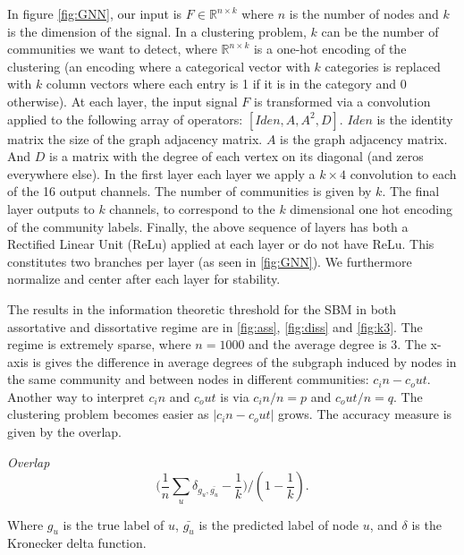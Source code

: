 In figure \ref{fig:GNN}, our input is $F\in \mathbb{R}^{n \times k}$ where $n$ is the number of nodes and $k$ is the dimension of the signal.  In a clustering problem, $k$ can be the number of communities we want to detect, where $\mathbb{R}^{n\times k}$ is a one-hot encoding of the clustering (an encoding where a categorical vector with $k$ categories is replaced with $k$ column vectors where each entry is 1 if it is in the category and 0 otherwise). At each layer, the input signal $F$ is transformed via a convolution applied to the following array of operators:  $[Iden, A, A^2, D]$.  $Iden$ is the identity matrix the size of the graph adjacency matrix.  $A$ is the graph adjacency matrix.  And $D$ is a matrix with the degree of each vertex on its diagonal (and zeros everywhere else).  In the first layer each layer we apply a $k \times 4$ convolution to each of the 16 output channels.  The number of communities is given by $k$.  The final layer outputs to $k$ channels, to correspond to the $k$ dimensional one hot encoding of the community labels.  Finally, the above sequence of layers has both a Rectified Linear Unit (ReLu) applied at each layer or do not have ReLu.  This constitutes two branches per layer (as seen in \ref{fig:GNN}).  We furthermore normalize and center after each layer for stability.  

The results in the information theoretic threshold for the SBM in both assortative and dissortative regime are in \ref{fig:ass}, \ref{fig:diss} and \ref{fig:k3}.  The regime is extremely sparse, where $n =1000$ and the average degree is $3$.  The x-axis is gives the difference in average degrees of the subgraph induced by nodes in the same community and between nodes in different communities: $c_in - c_out$.  Another way to interpret $c_in$ and $c_out$ is via $c_in/n = p$ and $c_out/n = q$.  The clustering problem becomes easier as $|c_in-c_out|$ grows.  The accuracy measure is given by the overlap. 
\begin{definition}\textit{Overlap}
$$ \big(\frac{1}{n}\sum_u \delta_{g_u, \bar{g_u}} - \frac{1}{k}\big)/(1-\frac{1}{k}).$$

Where $g_u$ is the true label of $u$, $\bar{g_u}$ is the predicted label of node $u$, and $\delta$ is the Kronecker delta function.  
\end{definition}


